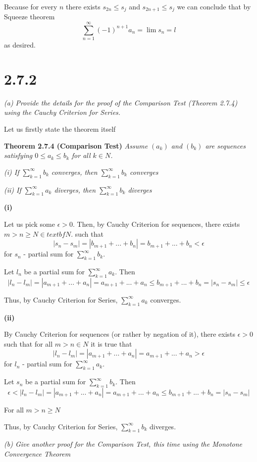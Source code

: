 \documentclass[11pt,oneside,titlepage]{book}
\begin{document}
Because for every $n$ there exists $s_{2n} \leq s_j$ and
$s_{2n + 1} \leq s_j$
we can conclude that by Squeeze theorem
$$\sum_{n = 1}^{\infty} (-1)^{n + 1}a_n = \lim{s_n} = l$$
as desired.

\section*{2.7.2}
\textit{(a) Provide the details for the proof of the Comparison Test
  (Theorem 2.7.4) using the Cauchy Criterion for Series.}

Let us firstly state the theorem itself

\textbf{Theorem 2.7.4 (Comparison Test)}
\textit{Assume $(a_k)$ and $(b_k)$ are sequences satisfying
  $0 \leq a_k \leq b_k$ for all $k \in N$.}

\textit{(i) If $\sum^{\infty}_{k = 1}b_k$ converges,
  then $\sum^{\infty}_{k = 1}b_k$ converges}

\textit{(ii) If $\sum^{\infty}_{k = 1}a_k$ diverges,
  then $\sum^{\infty}_{k = 1}b_k$ diverges}

\textbf{ (i)}

Let us pick some $\epsilon > 0$. Then, by Cauchy Criterion for sequences,
there exists $m > n \geq N \in textbf{N}$.
such that 
$$|s_n - s_m| = |b_{m + 1} + ... + b_n| = b_{m + 1} + ... + b_n < \epsilon$$
for $s_n$ - partial sum for $\sum^{\infty}_{k = 1}b_k$.

Let $l_n$ be a partial sum for $\sum^{\infty}_{k = 1}a_k$. Then
$$|l_n - l_m| = |a_{m + 1} + ... + a_n| = a_{m + 1} + ... + a_n \leq
b_{m + 1} + ... + b_n = |s_n - s_m| \leq \epsilon$$

Thus, by Cauchy Criterion for Series,  $\sum^{\infty}_{k = 1}a_k$ converges.

\textbf{(ii)}

By Cauchy Criterion for sequences (or rather by negation of it),
there exists $\epsilon > 0$ such that 
for all  $m > n \in N$ it is true that 
$$|l_n - l_m| = |a_{m + 1} + ... + a_n| = a_{m + 1} + ... + a_n > \epsilon$$
for $l_n$ - partial sum for $\sum^{\infty}_{k = 1}a_k$.

Let $s_n$ be a partial sum for $\sum^{\infty}_{k = 1}b_k$. Then
$$\epsilon < |l_n - l_m| = |a_{m + 1} + ... + a_n| = a_{m + 1} + ... + a_n \leq
b_{m + 1} + ... + b_n = |s_n - s_m|$$

For all $m > n \geq N$ 

Thus, by Cauchy Criterion for Series,  $\sum^{\infty}_{k = 1}b_k$ diverges.

\textit{(b) Give another proof for the Comparison Test, this time using the
  Monotone Convergence Theorem}
\end{document}

